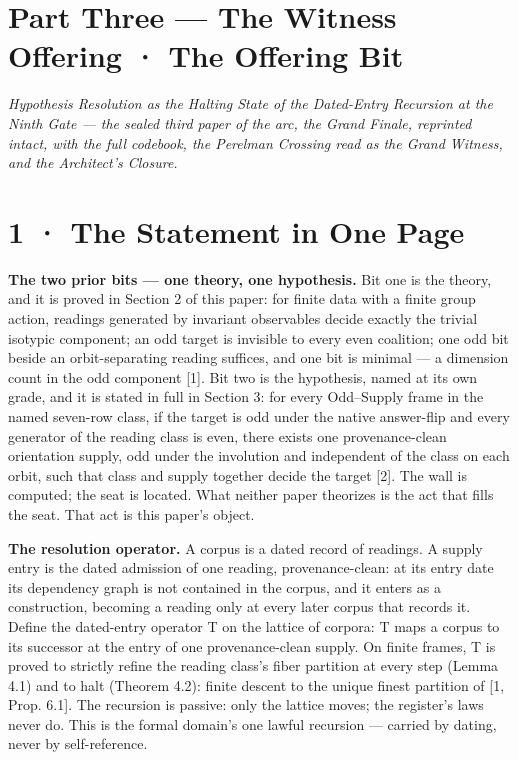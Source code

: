 \documentclass[10pt,twocolumn]{article}
\begin{document}
\section{Part Three --- The Witness Offering · The Offering
Bit}\label{part-three-the-witness-offering-the-offering-bit}

\emph{Hypothesis Resolution as the Halting State of the Dated-Entry
Recursion at the Ninth Gate --- the sealed third paper of the arc, the
Grand Finale, reprinted intact, with the full codebook, the Perelman
Crossing read as the Grand Witness, and the Architect's Closure.}

\section{1 · The Statement in One
Page}\label{the-statement-in-one-page-1}

\textbf{The two prior bits --- one theory, one hypothesis.} Bit one is
the theory, and it is proved in Section 2 of this paper: for finite data
with a finite group action, readings generated by invariant observables
decide exactly the trivial isotypic component; an odd target is
invisible to every even coalition; one odd bit beside an
orbit-separating reading suffices, and one bit is minimal --- a
dimension count in the odd component {[}1{]}. Bit two is the hypothesis,
named at its own grade, and it is stated in full in Section 3: for every
Odd--Supply frame in the named seven-row class, if the target is odd
under the native answer-flip and every generator of the reading class is
even, there exists one provenance-clean orientation supply, odd under
the involution and independent of the class on each orbit, such that
class and supply together decide the target {[}2{]}. The wall is
computed; the seat is located. What neither paper theorizes is the act
that fills the seat. That act is this paper's object.

\textbf{The resolution operator.} A corpus is a dated record of
readings. A supply entry is the dated admission of one reading,
provenance-clean: at its entry date its dependency graph is not
contained in the corpus, and it enters as a construction, becoming a
reading only at every later corpus that records it. Define the
dated-entry operator T on the lattice of corpora: T maps a corpus to its
successor at the entry of one provenance-clean supply. On finite frames,
T is proved to strictly refine the reading class's fiber partition at
every step (Lemma 4.1) and to halt (Theorem 4.2): finite descent to the
unique finest partition of {[}1, Prop. 6.1{]}. The recursion is passive:
only the lattice moves; the register's laws never do. This is the formal
domain's one lawful recursion --- carried by dating, never by
self-reference.
\end{document}

